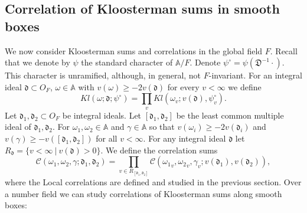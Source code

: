 \documentclass[a4paper,11pt]{amsart}
\theoremstyle{definition}
\newcommand{\A}{\mathbb{A}}
\begin{document}
    
    \subsection{Correlation of Kloosterman sums in smooth boxes} We now consider Kloosterman sums and correlations in the global field $F$. Recall that we denote by $\psi$ the standard character of $\A/F$. Denote $\psi^{\circ} = \psi(\mathfrak{D}^{-1}\cdot)$. This character is unramified, although, in general, not $F$-invariant. For an integral ideal $\mathfrak{d}\subset O_F$, $\omega \in \A$ with $v(\omega)\geq -2v(\mathfrak{d})$ for every $v<\infty$ we define 
    \begin{equation}\label{eq:Klosterman}Kl(\omega;\mathfrak{d};\psi^{\circ}) = \prod_{v}Kl(\omega_v;v(\mathfrak{d}),\psi_v^{\circ}). \end{equation}  
    Let $\mathfrak{d}_1,\mathfrak{d}_2 \subset O_F$ be integral ideals.    Let $[\mathfrak{d}_1,\mathfrak{d}_2]$ be the least common multiple ideal of $\mathfrak{d}_1,\mathfrak{d}_2$. For $\omega_1,\omega_2 \in \A$ and $\gamma \in \A$ so that $v(\omega_i) \geq -2v(\mathfrak{d}_i)$ and $v(\gamma) \geq -v([\mathfrak{d}_1,\mathfrak{d}_2])$ for all $v< \infty$. For any integral ideal $\mathfrak{d}$ let $R_{\mathfrak{d}} = \{v< \infty \ | \  v(\mathfrak{d})>0\}$. We define the correlation sums
    \begin{equation*}\label{eq:correlationkkloosterman}\mathcal{C}(\omega_1,\omega_2,\gamma; \mathfrak{d}_1,\mathfrak{d}_2) = \prod_{v\in R_{[\mathfrak{d}_1,\mathfrak{d}_2]}}\mathcal{C}({\omega_1}_v,{\omega_2}_v,\gamma_v;v(\mathfrak{d}_1),v(\mathfrak{d}_2)),\end{equation*} 
    where the Local correlations are defined and studied in the previous section. Over a number field we can study correlations of Kloosterman sums along smooth boxes:
    
\end{document}
